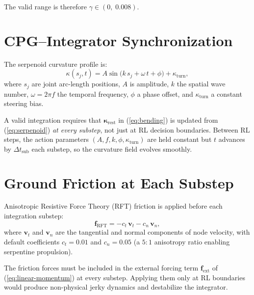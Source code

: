 \documentclass[11pt]{article}
\newcommand{\vect}[1]{\mathbf{#1}}
\newcommand{\dtsub}{\Delta t_{\mathrm{sub}}}
\newcommand{\krest}{\bm{\kappa}_{\mathrm{rest}}}
\begin{document}
\noindent The valid range is therefore $\gamma \in (0,\; 0.008)$.

\section{CPG--Integrator Synchronization}
\label{sec:cpg-sync}

The serpenoid curvature profile is:
\begin{equation}
  \kappa(s_j, t) = A \sin\!\bigl(k\, s_j + \omega\, t + \phi\bigr) + \kappa_{\mathrm{turn}},
  \label{eq:serpenoid}
\end{equation}
where $s_j$ are joint arc-length positions, $A$ is amplitude, $k$ the
spatial wave number, $\omega = 2\pi f$ the temporal frequency, $\phi$ a
phase offset, and $\kappa_{\mathrm{turn}}$ a constant steering bias.

A valid integration requires that $\krest$ in (\ref{eq:bending}) is updated
from (\ref{eq:serpenoid}) \emph{at every substep}, not just at RL decision
boundaries.  Between RL steps, the action parameters $(A, f, k, \phi,
\kappa_{\mathrm{turn}})$ are held constant but $t$ advances by $\dtsub$
each substep, so the curvature field evolves smoothly.

\section{Ground Friction at Each Substep}
\label{sec:friction}

Anisotropic Resistive Force Theory (RFT) friction is applied before each
integration substep:
\begin{equation}
  \vect{f}_{\mathrm{RFT}} = -c_t\,\vect{v}_t - c_n\,\vect{v}_n,
  \label{eq:rft}
\end{equation}
where $\vect{v}_t$ and $\vect{v}_n$ are the tangential and normal
components of node velocity, with default coefficients $c_t = 0.01$ and
$c_n = 0.05$ (a $5{:}1$ anisotropy ratio enabling serpentine propulsion).

The friction forces must be included in the external forcing term
$\vect{f}_{\mathrm{ext}}$ of (\ref{eq:linear-momentum}) at every substep.
Applying them only at RL boundaries would produce non-physical jerky
dynamics and destabilize the integrator.
\end{document}
